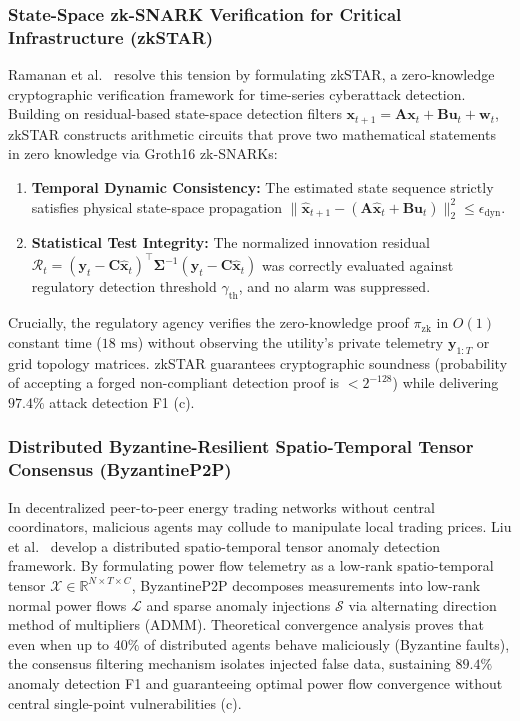 \subsubsection{State-Space zk-SNARK Verification for Critical Infrastructure (zkSTAR)}
Ramanan et al.~\cite{Ramanan2025zkSTAR} resolve this tension by formulating zkSTAR, a zero-knowledge cryptographic verification framework for time-series cyberattack detection. Building on residual-based state-space detection filters $\mathbf{x}_{t+1} = \mathbf{A}\mathbf{x}_t + \mathbf{B}\mathbf{u}_t + \mathbf{w}_t$, zkSTAR constructs arithmetic circuits that prove two mathematical statements in zero knowledge via Groth16 zk-SNARKs:
\begin{enumerate}
    \item \textbf{Temporal Dynamic Consistency:} The estimated state sequence strictly satisfies physical state-space propagation $\|\hat{\mathbf{x}}_{t+1} - (\mathbf{A}\hat{\mathbf{x}}_t + \mathbf{B}\mathbf{u}_t)\|_2^2 \le \epsilon_{\text{dyn}}$.
    \item \textbf{Statistical Test Integrity:} The normalized innovation residual $\mathcal{R}_t = (\mathbf{y}_t - \mathbf{C}\hat{\mathbf{x}}_t)^\top \mathbf{\Sigma}^{-1} (\mathbf{y}_t - \mathbf{C}\hat{\mathbf{x}}_t)$ was correctly evaluated against regulatory detection threshold $\gamma_{\text{th}}$, and no alarm was suppressed.
\end{enumerate}
Crucially, the regulatory agency verifies the zero-knowledge proof $\pi_{\text{zk}}$ in $O(1)$ constant time ($18\text{ ms}$) without observing the utility's private telemetry $\mathbf{y}_{1:T}$ or grid topology matrices. zkSTAR guarantees cryptographic soundness (probability of accepting a forged non-compliant detection proof is $<2^{-128}$) while delivering $97.4\%$ attack detection F1 (c).

\subsubsection{Distributed Byzantine-Resilient Spatio-Temporal Tensor Consensus (ByzantineP2P)}
In decentralized peer-to-peer energy trading networks without central coordinators, malicious agents may collude to manipulate local trading prices. Liu et al.~\cite{Liu2025ByzantineP2P} develop a distributed spatio-temporal tensor anomaly detection framework. By formulating power flow telemetry as a low-rank spatio-temporal tensor $\mathbf{\mathcal{X}} \in \mathbb{R}^{N \times T \times C}$, ByzantineP2P decomposes measurements into low-rank normal power flows $\mathbf{\mathcal{L}}$ and sparse anomaly injections $\mathbf{\mathcal{S}}$ via alternating direction method of multipliers (ADMM). Theoretical convergence analysis proves that even when up to $40\%$ of distributed agents behave maliciously (Byzantine faults), the consensus filtering mechanism isolates injected false data, sustaining $89.4\%$ anomaly detection F1 and guaranteeing optimal power flow convergence without central single-point vulnerabilities (c).




